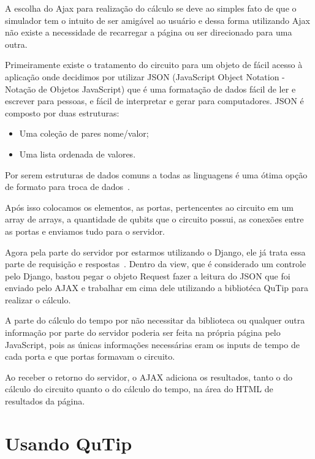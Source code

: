 \documentclass[a4paper, 12pt, oneside]{book}
\begin{document}
A escolha do Ajax para realização do cálculo se deve ao simples fato de que o simulador tem o intuito de ser amigável ao usuário e dessa forma utilizando Ajax não existe a necessidade de recarregar a página ou ser direcionado para uma outra.

Primeiramente existe o tratamento do circuito para um objeto de fácil acesso à aplicação onde decidimos por utilizar JSON (JavaScript Object Notation - Notação de Objetos JavaScript) que é uma formatação de dados fácil de ler e escrever para pessoas, e fácil de interpretar e gerar para computadores. JSON é composto por duas estruturas:
\begin{itemize}
\item Uma coleção de pares nome/valor;
\item Uma lista ordenada de valores.
\end{itemize}
Por serem estruturas de dados comuns a todas as linguagens é uma ótima opção de formato para troca de dados~\cite{json}.

Após isso colocamos os elementos, as portas, pertencentes ao circuito em um array de arrays, a quantidade de qubits que o circuito possui, as conexões entre as portas e enviamos tudo para o servidor.

Agora pela parte do servidor por estarmos utilizando o Django, ele já trata essa parte de requisição e respostas~\cite{django-req-resp}. Dentro da view, que é considerado um controle pelo Django, bastou pegar o objeto Request fazer a leitura do JSON que foi enviado pelo AJAX e trabalhar em cima dele utilizando a bibliotéca QuTip para realizar o cálculo.

A parte do cálculo do tempo por não necessitar da biblioteca ou qualquer outra informação por parte do servidor poderia ser feita na própria página pelo JavaScript, pois as únicas informações necessárias eram os inputs de tempo de cada porta e que portas formavam o circuito.

Ao receber o retorno do servidor, o AJAX adiciona os resultados, tanto o do cálculo do circuito quanto o do cálculo do tempo, na área do HTML de resultados da página.

\section{Usando QuTip}
\end{document}
